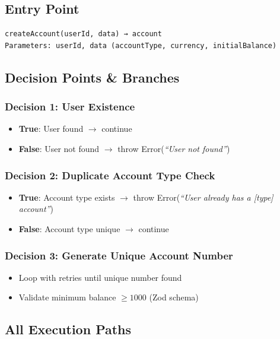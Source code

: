 \subsection{Entry Point}
\begin{verbatim}
createAccount(userId, data) → account
Parameters: userId, data (accountType, currency, initialBalance)
\end{verbatim}

\subsection{Decision Points \& Branches}

\subsubsection{Decision 1: User Existence}
\begin{itemize}
    \item \textbf{True}: User found $\rightarrow$ continue
    \item \textbf{False}: User not found $\rightarrow$ throw Error(\textit{``User not found''})
\end{itemize}

\subsubsection{Decision 2: Duplicate Account Type Check}
\begin{itemize}
    \item \textbf{True}: Account type exists $\rightarrow$ throw Error(\textit{``User already has a [type] account''})
    \item \textbf{False}: Account type unique $\rightarrow$ continue
\end{itemize}

\subsubsection{Decision 3: Generate Unique Account Number}
\begin{itemize}
    \item Loop with retries until unique number found
    \item Validate minimum balance $\geq 1000$ (Zod schema)
\end{itemize}

\subsection{All Execution Paths}


